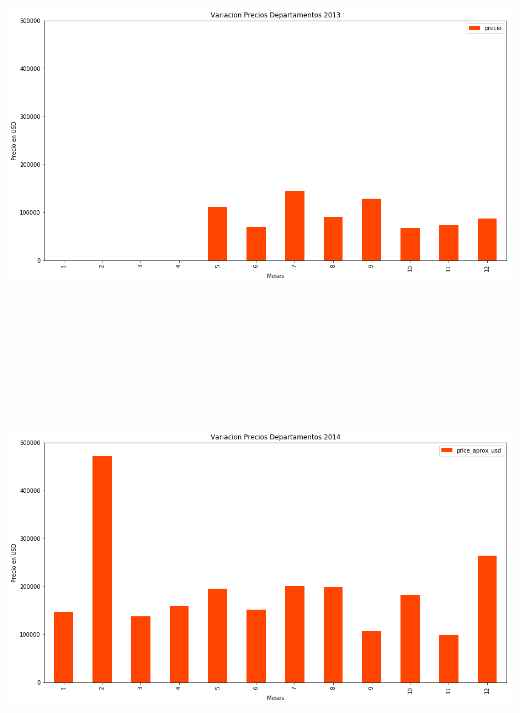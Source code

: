 \documentclass[a4paper, 10pt]{article}
\begin{document}
        \begin{center}
              \includegraphics[width=6in, height=4.2in]{images/vDeptos2013}
        \end{center}
        \begin{center}
              \includegraphics[width=6in, height=4.2in]{images/vDeptos2014}
        \end{center}
\end{document}
